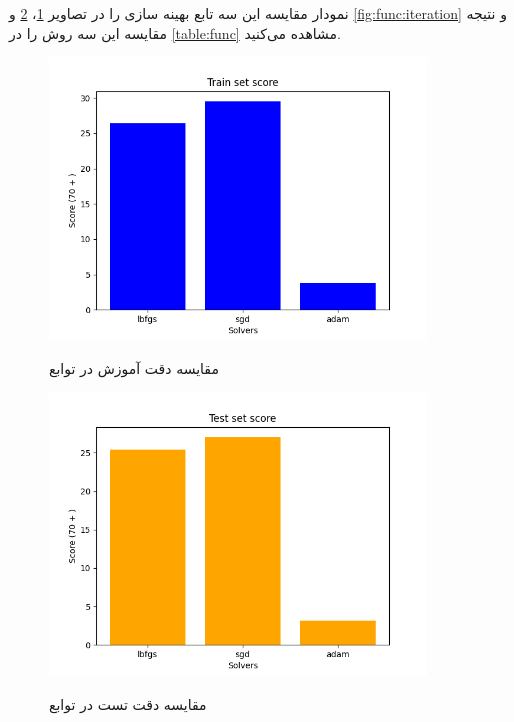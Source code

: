 \documentclass[12pt, dvipsnames, svgnames, x11names,]{article}
\begin{document}
			نمودار مقایسه این سه تابع بهینه سازی را در تصاویر \ref{fig:func:train}، \ref{fig:func:test} و \ref{fig:func:iteration} و نتیجه مقایسه این سه روش را در \ref{table:func} مشاهده می‌کنید.
			
			\begin{figure}
				\begin{center}
					{\includegraphics[width=10cm]{images/03.png}}
				\end{center}
				\caption{مقایسه دقت آموزش در توابع}
				\label{fig:func:train}
			\end{figure}
			
			\begin{figure}
				\begin{center}
					{\includegraphics[width=10cm]{images/04.png}}
				\end{center}
				\caption{مقایسه دقت تست در توابع}
				\label{fig:func:test}
			\end{figure}
			
\end{document}
